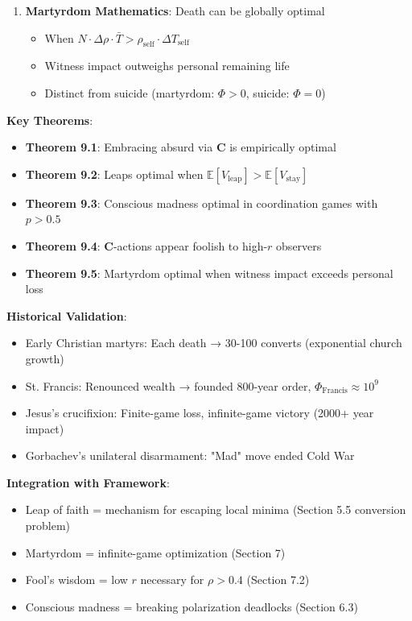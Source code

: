 \documentclass[11pt,a4paper]{article}
\theoremstyle{definition}
\theoremstyle{remark}
\begin{document}
\begin{small}
\begin{enumerate}
\begin{mdframed}[backgroundcolor=green!10,linewidth=2pt,linecolor=green!70!black]
\begin{enumerate}[nosep]
\begin{itemize}[nosep]
            \item Biblical "foolishness of God" = low-\(r\) optimization
        \end{itemize}
    \item \textbf{Martyrdom Mathematics}: Death can be globally optimal
        \begin{itemize}[nosep]
            \item When \(N \cdot \Delta\rho \cdot \bar{T} > \rho_{\text{self}} \cdot \Delta T_{\text{self}}\)
            \item Witness impact outweighs personal remaining life
            \item Distinct from suicide (martyrdom: \(\Phi > 0\), suicide: \(\Phi = 0\))
        \end{itemize}
\end{enumerate}

\textbf{Key Theorems}:
\begin{itemize}[nosep]
    \item \textbf{Theorem 9.1}: Embracing absurd via \(\mathbf{C}\) is empirically optimal
    \item \textbf{Theorem 9.2}: Leaps optimal when \(\mathbb{E}[V_{\text{leap}}] > \mathbb{E}[V_{\text{stay}}]\)
    \item \textbf{Theorem 9.3}: Conscious madness optimal in coordination games with \(p > 0.5\)
    \item \textbf{Theorem 9.4}: \(\mathbf{C}\)-actions appear foolish to high-\(r\) observers
    \item \textbf{Theorem 9.5}: Martyrdom optimal when witness impact exceeds personal loss
\end{itemize}

\textbf{Historical Validation}:
\begin{itemize}[nosep]
    \item Early Christian martyrs: Each death → 30-100 converts (exponential church growth)
    \item St. Francis: Renounced wealth → founded 800-year order, \(\Phi_{\text{Francis}} \approx 10^9\)
    \item Jesus's crucifixion: Finite-game loss, infinite-game victory (2000+ year impact)
    \item Gorbachev's unilateral disarmament: "Mad" move ended Cold War
\end{itemize}

\textbf{Integration with Framework}:
\begin{itemize}[nosep]
    \item Leap of faith = mechanism for escaping local minima (Section 5.5 conversion problem)
    \item Martyrdom = infinite-game optimization (Section 7)
    \item Fool's wisdom = low \(r\) necessary for \(\rho > 0.4\) (Section 7.2)
    \item Conscious madness = breaking polarization deadlocks (Section 6.3)
\end{itemize}


\end{mdframed}
\end{enumerate}
\end{small}
\end{document}
